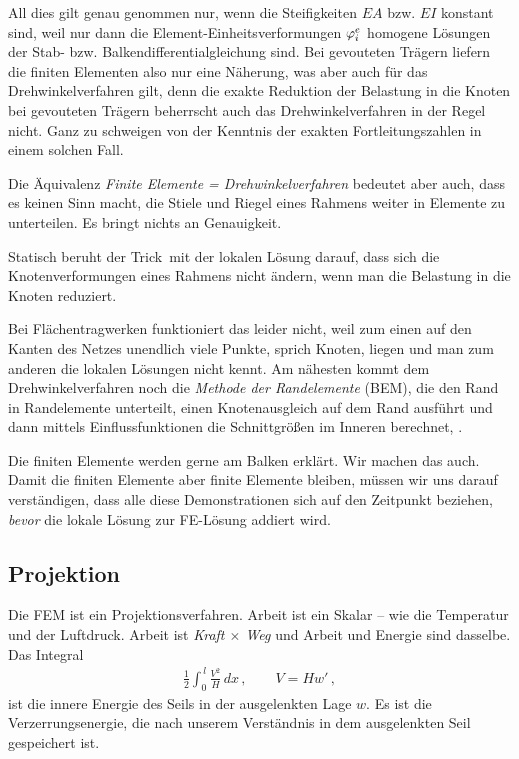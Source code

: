 All dies gilt genau genommen nur, wenn die Steifigkeiten $EA$ bzw. $EI$ konstant sind, weil nur dann die Element-Einheitsverformungen $\varphi_i^e$ homogene L\"{o}sungen der Stab- bzw. Balkendifferentialgleichung sind. Bei gevouteten Tr\"{a}gern liefern die finiten Elementen  also nur eine N\"{a}herung, was aber auch f\"{u}r das Drehwinkelverfahren gilt, denn die exakte Reduktion der Belastung in die Knoten bei gevouteten Tr\"{a}gern beherrscht auch das Drehwinkelverfahren in der Regel nicht. Ganz zu schweigen von der Kenntnis der exakten Fortleitungszahlen in einem solchen Fall.

Die \"{A}quivalenz {\em Finite Elemente = Drehwinkelverfahren\/} bedeutet aber auch, dass es keinen Sinn macht, die Stiele und Riegel eines Rahmens weiter in Elemente zu unterteilen. Es bringt nichts an Genauigkeit.

Statisch beruht der \glq Trick\grq\ mit der lokalen L\"{o}sung darauf, dass sich die Knotenverformungen eines Rahmens nicht \"{a}ndern, wenn man die Belastung in die Knoten reduziert.

Bei Fl\"{a}chentragwerken funktioniert das leider nicht, weil zum einen auf den Kanten des Netzes unendlich viele Punkte, sprich Knoten, liegen und man zum anderen die lokalen L\"{o}sungen nicht kennt. Am n\"{a}hesten kommt dem Drehwinkelverfahren noch die {\em Methode der Randelemente\/} (BEM), die den Rand in Randelemente unterteilt, einen Knotenausgleich auf dem Rand ausf\"{u}hrt und dann mittels Einflussfunktionen die Schnittgr\"{o}{\ss}en im Inneren berechnet, \cite{Ha2}.

\begin{remark}
Die finiten Elemente werden gerne am Balken erkl\"{a}rt. Wir machen das auch. Damit die finiten Elemente aber finite Elemente bleiben, m\"{u}ssen wir uns darauf verst\"{a}ndigen, dass alle diese Demonstrationen sich auf den Zeitpunkt beziehen, {\em bevor\/} die lokale L\"{o}sung zur FE-L\"{o}sung addiert wird.
\end{remark}
\vspace{-1cm}

{\textcolor{sectionTitleBlue}{\section{Projektion}}}\label{Projektion}


Die FEM ist ein Projektionsverfahren. Arbeit ist ein Skalar -- wie die Temperatur und der Luftdruck. Arbeit ist {\em Kraft $\times$ Weg\/} und Arbeit und Energie sind
dasselbe. Das Integral
\begin{align}
 \frac{1}{2} \int_0^{\,l} \frac{V^2}{H}\, dx\,, \qquad V = H w'\,,
\end{align}
ist die innere Energie des Seils in der ausgelenkten Lage $w$. Es ist die Verzerrungsenergie, die nach unserem Verst\"{a}ndnis in dem ausgelenkten Seil  gespeichert ist.

